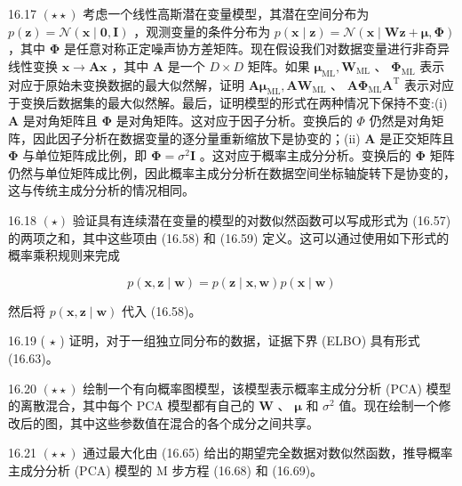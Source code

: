 \documentclass[10pt]{article}
\begin{document}
16.17 \(\left( {\star  \star  }\right)\) 考虑一个线性高斯潜在变量模型，其潜在空间分布为 \(p\left( \mathbf{z}\right)  = \mathcal{N}\left( {\mathbf{x} \mid  \mathbf{0},\mathbf{I}}\right)\) ，观测变量的条件分布为 \(p\left( {\mathbf{x} \mid  \mathbf{z}}\right)  = \mathcal{N}\left( {\mathbf{x} \mid  \mathbf{W}\mathbf{z} + \mathbf{\mu },\mathbf{\Phi }}\right)\) ，其中 \(\mathbf{\Phi }\) 是任意对称正定噪声协方差矩阵。现在假设我们对数据变量进行非奇异线性变换 \(\mathbf{x} \rightarrow  \mathbf{A}\mathbf{x}\) ，其中 \(\mathbf{A}\) 是一个 \(D \times  D\) 矩阵。如果 \({\mathbf{\mu }}_{\mathrm{{ML}}},{\mathbf{W}}_{\mathrm{{ML}}}\) 、 \({\mathbf{\Phi }}_{\mathrm{{ML}}}\) 表示对应于原始未变换数据的最大似然解，证明 \(\mathbf{A}{\mathbf{\mu }}_{\mathrm{{ML}}},\mathbf{A}{\mathbf{W}}_{\mathrm{{ML}}}\) 、 \(\mathbf{A}{\mathbf{\Phi }}_{\mathrm{{ML}}}{\mathbf{A}}^{\mathrm{T}}\) 表示对应于变换后数据集的最大似然解。最后，证明模型的形式在两种情况下保持不变:(i) \(\mathbf{A}\) 是对角矩阵且 \(\mathbf{\Phi }\) 是对角矩阵。这对应于因子分析。变换后的 \(\Phi\) 仍然是对角矩阵，因此因子分析在数据变量的逐分量重新缩放下是协变的；(ii) \(\mathbf{A}\) 是正交矩阵且 \(\mathbf{\Phi }\) 与单位矩阵成比例，即 \(\mathbf{\Phi } = {\sigma }^{2}\mathbf{I}\) 。这对应于概率主成分分析。变换后的 \(\mathbf{\Phi }\) 矩阵仍然与单位矩阵成比例，因此概率主成分分析在数据空间坐标轴旋转下是协变的，这与传统主成分分析的情况相同。

16.18 \(\left( \star \right)\) 验证具有连续潜在变量的模型的对数似然函数可以写成形式为 (16.57) 的两项之和，其中这些项由 (16.58) 和 (16.59) 定义。这可以通过使用如下形式的概率乘积规则来完成

\[
p\left( {\mathbf{x},\mathbf{z} \mid  \mathbf{w}}\right)  = p\left( {\mathbf{z} \mid  \mathbf{x},\mathbf{w}}\right) p\left( {\mathbf{x} \mid  \mathbf{w}}\right)  \tag{16.89}
\]

然后将 \(p\left( {\mathbf{x},\mathbf{z} \mid  \mathbf{w}}\right)\) 代入 (16.58)。

16.19 ( \(\star\) ) 证明，对于一组独立同分布的数据，证据下界 (ELBO) 具有形式 (16.63)。

16.20 \(\left( {\star  \star  }\right)\) 绘制一个有向概率图模型，该模型表示概率主成分分析 (PCA) 模型的离散混合，其中每个 PCA 模型都有自己的 \(\mathbf{W}\) 、 \(\mathbf{\mu }\) 和 \({\sigma }^{2}\) 值。现在绘制一个修改后的图，其中这些参数值在混合的各个成分之间共享。

16.21 \(\left( {\star  \star  }\right)\) 通过最大化由 (16.65) 给出的期望完全数据对数似然函数，推导概率主成分分析 (PCA) 模型的 M 步方程 (16.68) 和 (16.69)。
\end{document}
